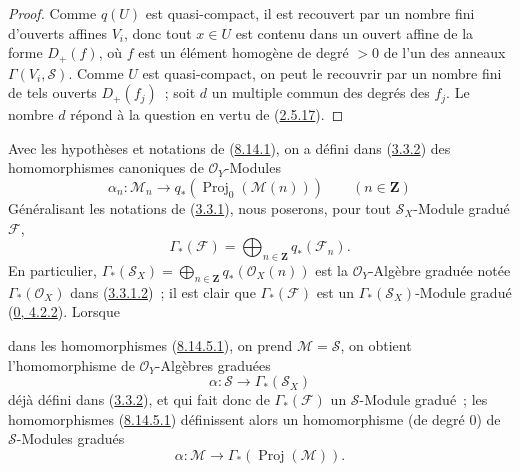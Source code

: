 \begin{proof}
Comme $q(U)$ est quasi-compact, il est recouvert par un nombre fini d'ouverts
affines $V_i$, donc tout $x\in U$ est contenu dans un ouvert affine de la
forme $D_+(f)$, où $f$ est un élément homogène de degré $>0$ de l'un des
anneaux $\Gamma(V_i,\mathcal{S})$. Comme $U$ est quasi-compact, on peut le
recouvrir par un nombre fini de tels ouverts $D_+(f_j)$~; soit $d$ un
multiple commun des degrés des $f_j$. Le nombre $d$ répond à la question en
vertu de (\hyperref[II.2.5.17-fr]{2.5.17}).
\end{proof}

\begin{env}[8.14.5]
\label{II.8.14.5-fr}
Avec les hypothèses et notations de (\hyperref[II.8.14.1-fr]{8.14.1}), on a
défini dans (\hyperref[II.3.3.2-fr]{3.3.2}) des homomorphismes canoniques de
$\mathcal{O}_Y$-Modules
\begin{equation}
\label{II.8.14.5.1-fr}
  \alpha_n:\mathcal{M}_n\to
  q_*(\operatorname{Proj}_0(\mathcal{M}(n)))
  \qquad(n\in\mathbf{Z})
\tag{8.14.5.1}
\end{equation}
Généralisant les notations de (\hyperref[II.3.3.1-fr]{3.3.1}), nous
poserons, pour tout $\mathcal{S}_X$-Module gradué $\mathcal{F}$,
\begin{equation}
\label{II.8.14.5.2-fr}
  \Gamma_*(\mathcal{F})=
  \bigoplus_{n\in\mathbf{Z}}q_*(\mathcal{F}_n).
\tag{8.14.5.2}
\end{equation}
En particulier,
$\Gamma_*(\mathcal{S}_X)=\bigoplus_{n\in\mathbf{Z}}q_*(\mathcal{O}_X(n))$
est la $\mathcal{O}_Y$-Algèbre graduée notée
$\Gamma_*(\mathcal{O}_X)$ dans
(\hyperref[II.3.3.1.2-fr]{3.3.1.2})~; il est clair que
$\Gamma_*(\mathcal{F})$ est un $\Gamma_*(\mathcal{S}_X)$-Module gradué
(\hyperref[0.4.2.2-fr]{0, 4.2.2}). Lorsque

dans les homomorphismes (\hyperref[II.8.14.5.1-fr]{8.14.5.1}), on prend
$\mathcal{M}=\mathcal{S}$, on obtient l'homomorphisme de
$\mathcal{O}_Y$-Algèbres graduées
\begin{equation}
\label{II.8.14.5.3-fr}
  \alpha:\mathcal{S}\to\Gamma_*(\mathcal{S}_X)
\tag{8.14.5.3}
\end{equation}
déjà défini dans (\hyperref[II.3.3.2-fr]{3.3.2}), et qui fait donc de
$\Gamma_*(\mathcal{F})$ un $\mathcal{S}$-Module gradué~; les homomorphismes
(\hyperref[II.8.14.5.1-fr]{8.14.5.1}) définissent alors un homomorphisme (de
degré $0$) de $\mathcal{S}$-Modules gradués
\begin{equation}
\label{II.8.14.5.4-fr}
  \alpha:\mathcal{M}\to\Gamma_*(\operatorname{Proj}(\mathcal{M})).
\tag{8.14.5.4}
\end{equation}
\end{env}

